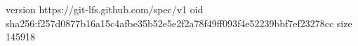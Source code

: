 version https://git-lfs.github.com/spec/v1
oid sha256:f257d0877b16a15c4afbe35b52e5e2f2a78f49ff093f4e52239bbf7ef23278cc
size 145918
